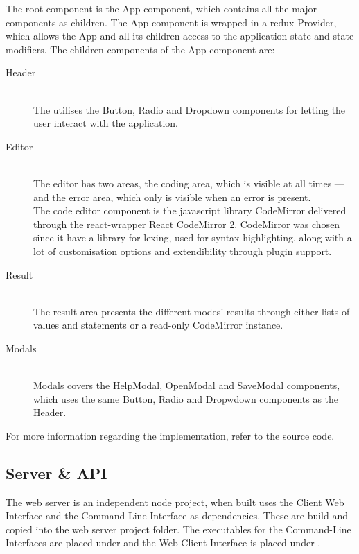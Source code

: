 \noindent
The root component is the App component, which contains all the major components as children.
The App component is wrapped in a redux Provider, which allows the App and all its children access to the application state and state modifiers.
The children components of the App component are:

\begin{description}

  \item[Header]~\\
    The utilises the Button, Radio and Dropdown components for letting the user interact with the application.\\

  \item[Editor]~\\
    The editor has two areas, the coding area, which is visible at all times --- and the error area, which only is visible when an error is present.\\
    The code editor component is the javascript library CodeMirror \cite{CM} delivered through the react-wrapper React CodeMirror 2.
    CodeMirror was chosen since it have a library for lexing, used for syntax highlighting, along with a lot of customisation options and extendibility through plugin support.\\

  \item[Result]~\\
    The result area presents the different modes' results through either lists of values and statements or a read-only CodeMirror instance.\\

  \item[Modals]~\\
    Modals covers the HelpModal, OpenModal and SaveModal components, which uses the same Button, Radio and Dropwdown components as the Header.\\

\end{description}

For more information regarding the implementation, refer to the source code.\\



\subsection{Server \& API}

The web server is an independent node project, when built uses the Client Web Interface and the Command-Line Interface as dependencies.
These are build and copied into the web server project folder.
The executables for the Command-Line Interfaces are placed under  and the Web Client Interface is placed under .\\


